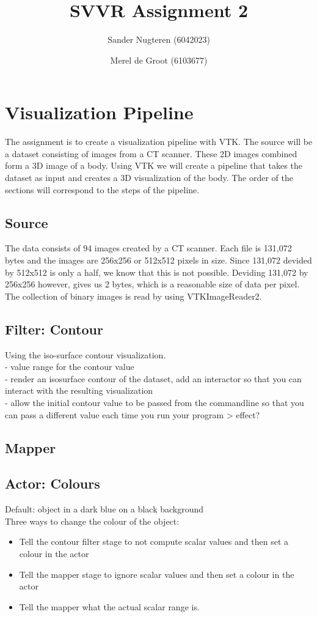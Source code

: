 \documentclass{article}
\begin{document}
\title{SVVR Assignment 2}
\author{Sander Nugteren (6042023) \and Merel de Groot (6103677)}
\renewcommand{\today}{November 17, 2014}
\maketitle

\section{Visualization Pipeline}
The assignment is to create a visualization pipeline with VTK. The source will be a dataset consisting of images from a CT scanner. These 2D images combined form a 3D image of a body. Using VTK we will create a pipeline that takes the dataset as input and creates a 3D visualization of the body. The order of the sections will correspond to the steps of the pipeline.

\subsection{Source}
The data consists of 94 images created by a CT scanner. Each file is 131,072 bytes and the images are 256x256 or 512x512 pixels in size. Since 131,072 devided by 512x512 is only a half, we know that this is not possible. Deviding 131,072 by 256x256 however, gives us 2 bytes, which is a reasonable size of data per pixel. The collection of binary images is read by using VTKImageReader2.

\subsection{Filter: Contour}
Using the iso-surface contour visualization. 
\\ - value range for the contour value
\\ - render an isosurface contour of the dataset, add an interactor so that you can interact with the resulting visualization
\\ - allow the initial contour value to be passed from the commandline so that you can pass a different value each time you run your program > effect?

\subsection{Mapper}

\subsection{Actor: Colours}
Default: object in a dark blue on a black background
\\ Three ways to change the colour of the object:
\begin{itemize}
\item Tell the contour filter stage to not compute scalar values and then set a colour in the actor
\item Tell the mapper stage to ignore scalar values and then set a colour in the actor
\item Tell the mapper what the actual scalar range is. 
\end{itemize}
\end{document}
